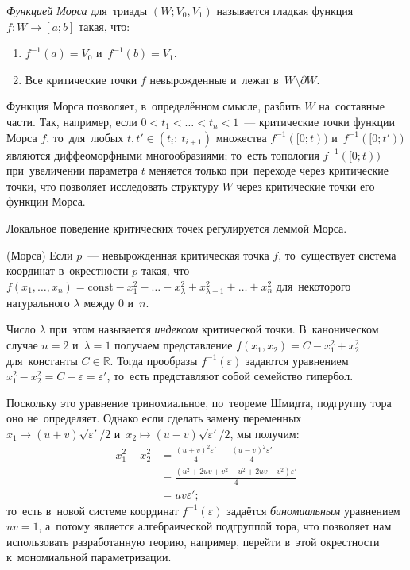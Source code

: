 \documentclass[a4paper,oneside]{article}
\begin{document}
\textit{Функцией Морса} для~триады $(W; V_0, V_1)$ называется гладкая функция $f : W \rightarrow [a; b]$
такая, что:
\begin{enumerate}
  \item $f^{-1}(a) = V_0$ и~$f^{-1}(b) = V_1$.
  \item Все критические точки $f$ невырожденные и~лежат в~$W \setminus \partial W$.
\end{enumerate}
Функция Морса позволяет, в~определённом смысле, разбить $W$ на~составные части. Так, например,
если $0 < t_1 < \ldots < t_n < 1$~— критические точки функции Морса $f$,
то~для~любых $t, t' \in (t_i;\ t_{i + 1})$ множества $f^{-1}([0; t))$ и~$f^{-1}([0; t'))$
являются диффеоморфными многообразиями; то~есть топология $f^{-1}([0; t))$ при~увеличении
параметра $t$ меняется только при~переходе через критические точки, что позволяет исследовать
структуру $W$ через критические точки его функции Морса.

Локальное поведение критических точек регулируется леммой Морса.
\begin{lemma*} (Морса)
  Если $p$~— невырожденная критическая точка $f$, то~существует система координат
  в~окрестности $p$ такая, что $f(x_1, \ldots, x_n) = \mathrm{const} - x_1^2 - \ldots - x_\lambda^2 +
  x_{\lambda + 1}^2 + \ldots + x_n^2$ для~некоторого натурального $\lambda$ между $0$ и~$n$.
\end{lemma*}

Число $\lambda$ при~этом называется \textit{индексом} критической точки. В~каноническом случае $n = 2$
и~$\lambda = 1$ получаем представление $f(x_1, x_2) = C - x_1^2 + x_2^2$ для~константы $C \in \mathbb{R}$.
Тогда прообразы $f^{-1}(\varepsilon)$ задаются уравнением $x_1^2 - x_2^2 = C - \varepsilon = \varepsilon'$,
то~есть представляют собой семейство гипербол.

Поскольку это уравнение триномиальное, по~теореме Шмидта, подгруппу тора оно не~определяет.
Однако если сделать замену переменных $x_1 \mapsto (u + v) \sqrt{\varepsilon'} / 2$
и~$x_2 \mapsto (u - v) \sqrt{\varepsilon'} / 2$, мы получим:
\[
\begin{aligned}
  x_1^2 - x_2^2 &= \frac{(u + v)^2 \varepsilon'}{4} - \frac{(u - v)^2 \varepsilon'}{4} \\
                &= \frac{(u^2 + 2uv + v^2 - u^2 + 2uv - v^2)\varepsilon'}{4} \\
                &= uv \varepsilon';
\end{aligned}
\]
то~есть в~новой системе координат $f^{-1}(\varepsilon)$ задаётся \textit{биномиальным} уравнением $uv = 1$,
а~потому является алгебраической подгруппой тора, что позволяет нам использовать разработанную теорию,
например, перейти в~этой окрестности к~мономиальной параметризации.
\end{document}
